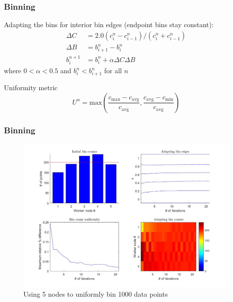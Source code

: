 \documentclass{beamer}
\begin{document}
\begin{frame}
	\frametitle{Binning}
	
	\begin{block}{Adapting the bins}
		for interior bin edges (endpoint bins stay constant):
		\begin{equation}
			\begin{split}
				\Delta C & = 2.0 ( c_i^n - c_{i-1}^n ) / ( c_i^n + c_{i-1}^n ) \\
				\Delta B & = b_{i+1}^n - b_i^n \\
				b_i^{n+1} & = b_i^n + \alpha \Delta C \Delta B
			\end{split}
		\end{equation}
		where $0 < \alpha < 0.5$ and $b_i^n < b_{i+1}^n$ for all $n$
	\end{block}
	
	\begin{block}{Uniformity metric}
		\begin{equation}
			U^n = \textrm{max}( \dfrac{c_{\textrm{max}} - c_{\textrm{avg}}}{c_{\textrm{avg}}}, \dfrac{c_{\textrm{avg}} - c_{\textrm{min}}}{c_{\textrm{avg}}} )
		\end{equation}
	\end{block}
\end{frame}

\begin{frame}
	\frametitle{Binning}
	
	\begin{figure}[!htb]
		\centering
		\vspace{-5pt}
		\includegraphics[scale = 0.25]{AdaptiveBinning_5Nodes_1000Lines_AverageLine}
		\vspace{-10pt}
		\caption{Using 5 nodes to uniformly bin 1000 data points}
	\end{figure}
\end{frame}
\end{document}
